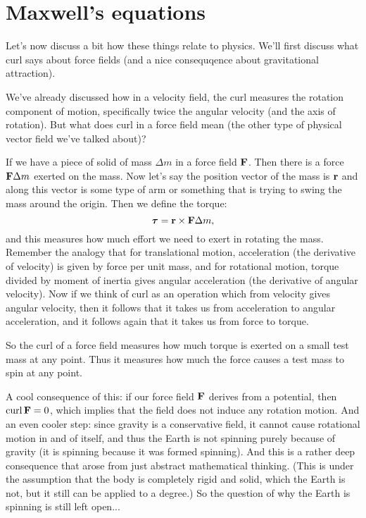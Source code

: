 \section{Maxwell's equations}

Let's now discuss a bit how these things relate to physics. We'll first discuss what curl says about force fields (and a nice consequqence about gravitational attraction).

We've already discussed how in a velocity field, the curl measures the rotation component of motion, specifically twice the angular velocity (and the axis of rotation). But what does curl in a force field mean (the other type of physical vector field we've talked about)?

If we have a piece of solid of mass $\Delta m$ in a force field $\boldsymbol{\mathbf{F}}$. Then there is a force $\boldsymbol{\mathbf{F}} \Delta m$ exerted on the mass. Now let's say the position vector of the mass is $\boldsymbol{\mathbf{r}}$ and along this vector is some type of arm or something that is trying to swing the mass around the origin. Then we define the torque:
\[ \boldsymbol{\mathbf{\tau}} = \boldsymbol{\mathbf{r}} \times \boldsymbol{\mathbf{F}} \Delta m, \]
and this measures how much effort we need to exert in rotating the mass.
\brm
Remember the analogy that for translational motion, acceleration (the derivative of velocity) is given by force per unit mass, and for rotational motion, torque divided by moment of inertia gives angular acceleration (the derivative of angular velocity).
\erm
Now if we think of curl as an operation which from velocity gives angular velocity, then it follows that it takes us from acceleration to angular acceleration, and it follows again that it takes us from force to torque.

So the curl of a force field measures how much torque is exerted on a small test mass at any point. Thus it measures how much the force causes a test mass to spin at any point. 

A cool consequence of this: if our force field $\boldsymbol{\mathbf{F}}$ derives from a potential, then $\mathrm{curl}\, \boldsymbol{\mathbf{F}} = 0$, which implies that the field does not induce any rotation motion. And an even cooler step: since gravity is a conservative field, it cannot cause rotational motion in and of itself, and thus the Earth is not spinning purely because of gravity (it is spinning because it was formed spinning). And this is a rather deep consequence that arose from just abstract mathematical thinking. (This is under the assumption that the body is completely rigid and solid, which the Earth is not, but it still can be applied to a degree.) So the question of why the Earth is spinning is still left open...

